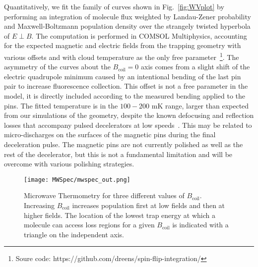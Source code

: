 \documentclass[%
 reprint,
groupedaddress,
 amsmath,amssymb,
 aps,
prl,
]{revtex4-1}
\newcommand{\epb}{$E\!\perp\!B$}
\begin{document}
Quantitatively, we fit the family of curves shown in Fig.~\ref{fig:WVplot} by performing an integration of molecule flux weighted by Landau-Zener probability and Maxwell-Boltzmann population density over the strangely twisted hyperbola of \epb. The computation is performed in COMSOL Multiphysics, accounting for the expected magnetic and electric fields from the trapping geometry with various offsets and with cloud temperature as the only free parameter~\footnote{Soure code: https://github.com/dreens/spin-flip-integration/}. The asymmetry of the curves about the $B_\text{coil}=0$ axis comes from a slight shift of the electric quadrupole minimum caused by an intentional bending of the last pin pair to increase fluorescence collection. This offset is not a free parameter in the model, it is directly included according to the measured bending applied to the pins. The fitted temperature is in the $100-200$ mK range, larger than expected from our simulations of the geometry, despite the known defocusing and reflection losses that accompany pulsed decelerators at low speeds~\cite{Sawyer2008a}. This may be related to micro-discharges on the surfaces of the magnetic pins during the final deceleration pulse. The magnetic pins are not currently polished as well as the rest of the decelerator, but this is not a fundamental limitation and will be overcome with various polishing strategies.

\begin{figure}[tb]
\texttt{[image: MWSpec/mwspec\_out.png]}%
\caption{
Microwave Thermometry for three different values of $B_\text{coil}$. Increasing $B_\text{coil}$ increases population first at low fields and then at higher fields. The location of the lowest trap energy at which a molecule can access loss regions for a given $B_\text{coil}$ is indicated with a triangle on the independent axis.
\label{fig:spec}}
\end{figure}
\end{document}
